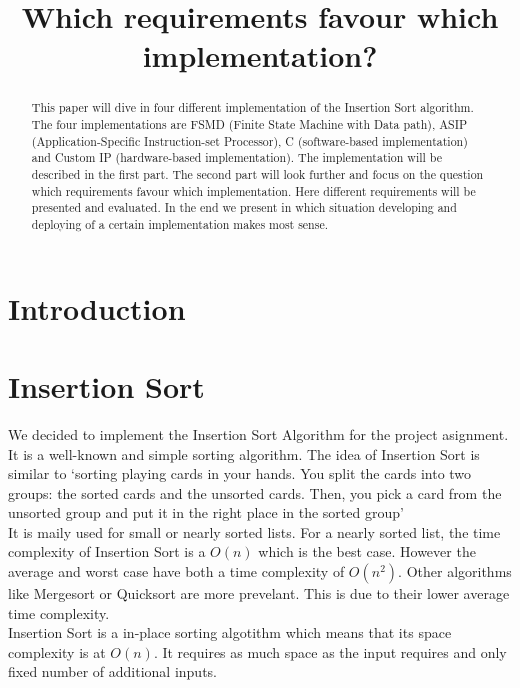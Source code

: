\documentclass[conference]{IEEEtran}
\begin{document}
\title{Which requirements favour which implementation? \\}

\maketitle

\begin{abstract}
This paper will dive in four different implementation of the Insertion Sort algorithm. The four implementations are FSMD (Finite State Machine with Data path), ASIP (Application-Specific Instruction-set Processor), C (software-based implementation) and Custom IP (hardware-based implementation). The implementation will be described in the first part. The second part will look further and focus on the question which requirements favour which implementation. Here different requirements will be presented and evaluated. In the end we present in which situation developing and deploying of a certain implementation makes most sense. 
\end{abstract}

\section{Introduction}

\section{Insertion Sort}
We decided to implement the Insertion Sort Algorithm for the project asignment. It is a well-known and simple sorting algorithm. The idea of Insertion Sort is similar to `sorting playing cards in your hands. You split the cards into two groups: the sorted cards and the unsorted cards. Then, you pick a card from the unsorted group and put it in the right place in the sorted group'~\cite{g4g}\\
It is maily used for small or nearly sorted lists. For a nearly sorted list, the time complexity of Insertion Sort is a $O(n)$ which is the best case. However the average and worst case have both a time complexity of $O(n^2)$. Other algorithms like Mergesort or Quicksort are more prevelant. This is due to their lower average time complexity.\\
Insertion Sort is a in-place sorting algotithm which means that its space complexity is at $O(n)$. It requires as much space as the input requires and only fixed number of additional inputs. 
\end{document}
